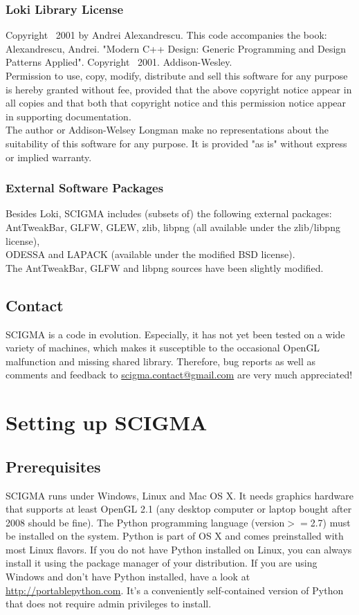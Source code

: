 \documentclass[10pt,a4paper,titlepage]{article}
\begin{document}
\subsubsection*{Loki Library License}
Copyright \textcopyright~2001 by Andrei Alexandrescu. This code accompanies the book:\\
Alexandrescu, Andrei. "Modern C++ Design: Generic Programming and Design
Patterns Applied". Copyright \textcopyright~2001. Addison-Wesley.\\
Permission to use, copy, modify, distribute and sell this software for any
purpose is hereby granted without fee, provided that the above copyright
notice appear in all copies and that both that copyright notice and this
permission notice appear in supporting documentation.\\
The author or Addison-Welsey Longman make no representations about the
suitability of this software for any purpose. It is provided "as is" without express or implied warranty.\\
\subsubsection*{External Software Packages}
Besides Loki, SCIGMA includes (subsets of) the following external packages:\\
AntTweakBar, GLFW, GLEW, zlib, libpng (all available under the zlib/libpng license),\\
ODESSA and LAPACK (available under the modified BSD license).\\
The AntTweakBar, GLFW and libpng sources have been slightly modified.
\newpage
\subsection*{Contact}
SCIGMA is a code in evolution. Especially, it has not yet been tested on a wide variety of machines, which makes it susceptible to the occasional OpenGL malfunction and missing shared library. Therefore, bug reports as well as comments and feedback to \href{mailto:scigma@gmail.com}{scigma.contact@gmail.com} are very much appreciated!
\newpage
\tableofcontents
\newpage
{}
\section{Setting up SCIGMA}
\subsection{Prerequisites}
SCIGMA runs under Windows, Linux and Mac OS X. It needs graphics hardware that supports at least OpenGL 2.1 (any desktop computer or laptop bought after 2008 should be fine). The Python programming language (version$>=$2.7) must be installed on the system. Python is part of OS X and comes preinstalled with most Linux flavors. If you do not have Python installed on Linux, you can always install it using the package manager of your distribution. If you are using Windows and don't have Python installed, have a look at \url{http://portablepython.com}. It's a conveniently self-contained version of Python that does not require admin privileges to install.
\end{document}
